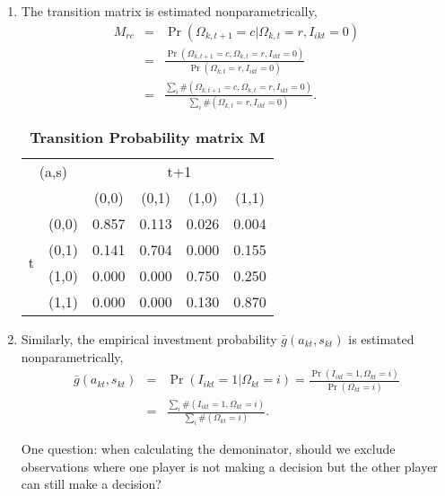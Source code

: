 \documentclass{article}
\begin{document}
\begin{enumerate}
\item The transition matrix is estimated nonparametrically,%
\begin{eqnarray*}
M_{rc} &=&\Pr \left( \Omega _{k,t+1}=c|\Omega _{k,t}=r,I_{ikt}=0\right) \\
&=&\frac{\Pr \left( \Omega _{k,t+1}=c,\Omega _{k,t}=r,I_{ikt}=0\right) }{\Pr
\left( \Omega _{k,t}=r,I_{ikt}=0\right) } \\
&=&\frac{\sum_{i}\#\left( \Omega _{k,t+1}=c,\Omega _{k,t}=r,I_{ikt}=0\right) 
}{\sum_{i}\#\left( \Omega _{k,t}=r,I_{ikt}=0\right) }.
\end{eqnarray*}


\begin{table}[htbp]
	\centering
	\caption{\textbf{Transition Probability matrix M}}
	\begin{tabular}{clcccc}
		\toprule
		\multicolumn{2}{c}{(a,s)} & \multicolumn{4}{c}{t+1} \\
		&       & (0,0) & (0,1) & (1,0) & (1,1) \\
		\midrule
		\multirow{4}[2]{*}{t} & (0,0) & 0.857 & 0.113 & 0.026 & 0.004 \\
		& (0,1) & 0.141 & 0.704 & 0.000 & 0.155 \\
		& (1,0) & 0.000 & 0.000 & 0.750 & 0.250 \\
		& (1,1) & 0.000 & 0.000 & 0.130 & 0.870 \\
		\bottomrule
	\end{tabular}%
	\label{tab:addlabel}%
\end{table}%



\item Similarly, the empirical investment probability $\bar{g}\left(
a_{kt},s_{kt}\right) $ is estimated nonparametrically,%
\begin{eqnarray*}
\bar{g}\left( a_{kt},s_{kt}\right) &=&\Pr \left( I_{ikt}=1|\Omega
_{kt}=i\right) =\frac{\Pr \left( I_{ikt}=1,\Omega _{kt}=i\right) }{\Pr
\left( \Omega _{kt}=i\right) } \\
&=&\frac{\sum_{i}\#\left( I_{ikt}=1,\Omega _{kt}=i\right) }{\sum_{i}\#\left(
\Omega _{kt}=i\right) }.
\end{eqnarray*}




One question: when calculating the demoninator, should we exclude
observations where one player is not making a decision but the other player
can still make a decision?



\end{enumerate}
\end{document}
